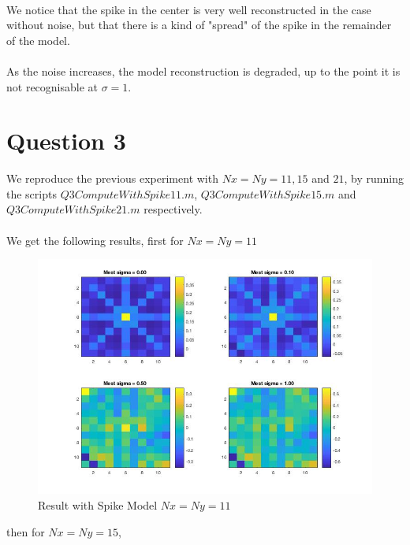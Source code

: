 \documentclass[12pt,a4paper]{extreport}
\begin{document}
\paragraph*{}
We notice that the spike in the center is very well reconstructed in the case without noise, but that there is a kind of "spread" of the spike in the remainder of the model.

\paragraph*{}
As the noise increases, the model reconstruction is degraded, up to the point it is not recognisable at $\sigma = 1$.

\section{Question 3}
We reproduce the previous experiment with  $Nx = Ny = 11, 15$ and $21$, by running the scripts $Q3ComputeWithSpike11.m$, $Q3ComputeWithSpike15.m$ and $Q3ComputeWithSpike21.m$ respectively.

\paragraph*{}
We get the following results, first for $Nx=Ny=11$

\begin{figure}[h]
\includegraphics[width=15cm]{Q3Spike11.jpg} 
\caption{Result with Spike Model $Nx=Ny=11$}
\end{figure}
\newpage
then for $Nx=Ny=15$,
\end{document}
